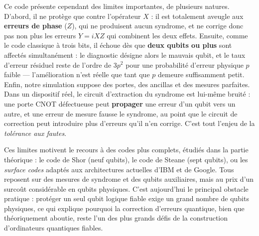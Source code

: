 \documentclass[a4paper,12pt]{article}
\begin{document}
Ce code présente cependant des limites importantes, de plusieurs natures.
D'abord, il ne protège que contre l'opérateur $X$ : il est totalement aveugle aux
\textbf{erreurs de phase} ($Z$), qui ne produisent aucun syndrome, et ne corrige
donc pas non plus les erreurs $Y = iXZ$ qui combinent les deux effets. Ensuite,
comme le code classique à trois bits, il échoue dès que \textbf{deux qubits ou
plus} sont affectés simultanément : le diagnostic désigne alors le mauvais qubit,
et le taux d'erreur résiduel reste de l'ordre de $3p^2$ pour une probabilité
d'erreur physique $p$ faible --- l'amélioration n'est réelle que tant que $p$
demeure suffisamment petit. Enfin, notre simulation suppose des portes, des
ancillas et des mesures parfaites. Dans un dispositif réel, le circuit
d'extraction du syndrome est lui-même bruité : une porte CNOT défectueuse peut
\textbf{propager} une erreur d'un qubit vers un autre, et une erreur de mesure
fausse le syndrome, au point que le circuit de correction peut introduire plus
d'erreurs qu'il n'en corrige. C'est tout l'enjeu de la \emph{tolérance aux
fautes}.

Ces limites motivent le recours à des codes plus complets, étudiés dans la
partie théorique : le code de Shor (neuf qubits), le code de Steane (sept
qubits), ou les \emph{surface codes} adaptés aux architectures actuelles d'IBM et
de Google. Tous reposent sur des mesures de syndrome et des qubits auxiliaires,
mais au prix d'un surcoût considérable en qubits physiques. C'est aujourd'hui le
principal obstacle pratique : protéger un seul qubit logique fiable exige un
grand nombre de qubits physiques, ce qui explique pourquoi la correction
d'erreurs quantique, bien que théoriquement aboutie, reste l'un des plus grands
défis de la construction d'ordinateurs quantiques fiables.
\end{document}

